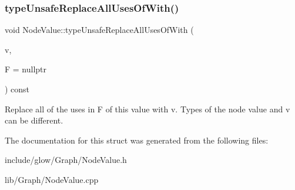 \subsubsection{\texorpdfstring{type\+Unsafe\+Replace\+All\+Uses\+Of\+With()}{typeUnsafeReplaceAllUsesOfWith()}}
{\footnotesize\ttfamily void Node\+Value\+::type\+Unsafe\+Replace\+All\+Uses\+Of\+With (\begin{DoxyParamCaption}\item[{\hyperlink{structglow_1_1_node_value}{Node\+Value}}]{v,  }\item[{const \hyperlink{classglow_1_1_function}{Function} $\ast$}]{F = {\ttfamily nullptr} }\end{DoxyParamCaption}) const}

Replace all of the uses in {\ttfamily F} of this value with {\ttfamily v}. Types of the node value and {\ttfamily v} can be different. 

The documentation for this struct was generated from the following files\+:\begin{DoxyCompactItemize}
\item 
include/glow/\+Graph/Node\+Value.\+h\item 
lib/\+Graph/Node\+Value.\+cpp\end{DoxyCompactItemize}
